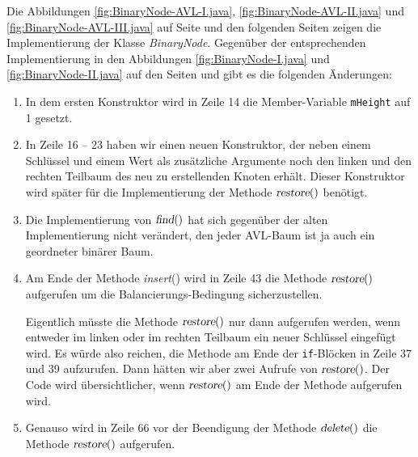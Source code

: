 Die Abbildungen \ref{fig:BinaryNode-AVL-I.java}, \ref{fig:BinaryNode-AVL-II.java} und
\ref{fig:BinaryNode-AVL-III.java} auf Seite \pageref{fig:BinaryNode-AVL-I.java}
und den folgenden Seiten zeigen die Implementierung der Klasse \textsl{BinaryNode}.
Gegen\"uber der entsprechenden Implementierung in den Abbildungen
\ref{fig:BinaryNode-I.java} und \ref{fig:BinaryNode-II.java} 
auf den Seiten \pageref{fig:BinaryNode-I.java} und \pageref{fig:BinaryNode-II.java} 
gibt es die folgenden Änderungen:
\begin{enumerate}
\item In dem ersten Konstruktor wird in Zeile 14 die Member-Variable \texttt{mHeight} auf
      1 gesetzt.
\item In Zeile 16 -- 23 haben wir einen neuen Konstruktor,
      der neben einem Schl\"ussel und einem Wert als zus\"atzliche Argumente noch den
      linken und den rechten Teilbaum des neu zu erstellenden Knoten erh\"alt.
      Dieser Konstruktor wird sp\"ater f\"ur die Implementierung der Methode $\textsl{restore}()$
      ben\"otigt.
\item Die Implementierung von $\textsl{find}()$ hat sich gegen\"uber der alten Implementierung 
      nicht ver\"andert, den jeder AVL-Baum ist ja auch ein geordneter bin\"arer Baum.
\item Am Ende der Methode \textsl{insert}() wird in Zeile 43 die Methode
      $\textsl{restore}()$ aufgerufen um die Balancierungs-Bedingung sicherzustellen. 

      Eigentlich m\"usste die Methode $\textsl{restore}()$ nur dann aufgerufen werden,
      wenn entweder im linken oder im rechten Teilbaum ein neuer Schl\"ussel eingef\"ugt wird.  Es w\"urde also
      reichen, die Methode am Ende der  \texttt{if}-Bl\"ocken in Zeile 37 und 39 aufzurufen.
      Dann h\"atten wir aber zwei Aufrufe von $\textsl{restore}()$.  Der Code wird 
      \"ubersichtlicher, wenn $\textsl{restore}()$ am Ende der Methode aufgerufen wird.
\item Genauso wird in Zeile 66 vor der Beendigung der Methode $\textsl{delete}()$
      die Methode $\textsl{restore}()$ aufgerufen.


\end{enumerate}
